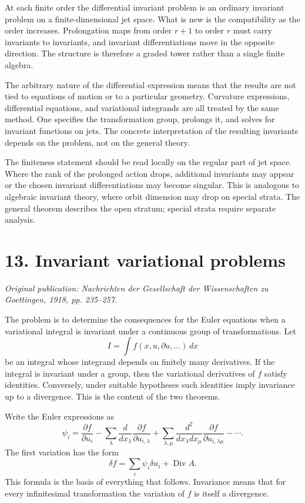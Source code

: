 \documentclass[12pt]{article}
\begin{document}
At each finite order the differential invariant problem is an ordinary invariant problem on a
finite-dimensional jet space. What is new is the compatibility as the order increases. Prolongation
maps from order \(r+1\) to order \(r\) must carry invariants to invariants, and invariant
differentiations move in the opposite direction. The structure is therefore a graded tower rather
than a single finite algebra.

The arbitrary nature of the differential expression means that the results are not tied to equations
of motion or to a particular geometry. Curvature expressions, differential equations, and
variational integrands are all treated by the same method. One specifies the transformation group,
prolongs it, and solves for invariant functions on jets. The concrete interpretation of the
resulting invariants depends on the problem, not on the general theory.

The finiteness statement should be read locally on the regular part of jet space. Where the rank of
the prolonged action drops, additional invariants may appear or the chosen invariant
differentiations may become singular. This is analogous to algebraic invariant theory, where orbit
dimension may drop on special strata. The general theorem describes the open stratum; special strata
require separate analysis.


\section{13. Invariant variational problems}

\textit{Original publication: Nachrichten der Gesellschaft der Wissenschaften zu Goettingen, 1918, pp. 235--257.}

The problem is to determine the consequences for the Euler equations when a variational integral is
invariant under a continuous group of transformations. Let \[   I=\int f(x,u,\partial u,\ldots)\,dx
\] be an integral whose integrand depends on finitely many derivatives. If the integral is invariant
under a group, then the variational derivatives of \(f\) satisfy identities. Conversely, under
suitable hypotheses such identities imply invariance up to a divergence. This is the content of the
two theorems.


Write the Euler expressions as \[   \psi_i=\frac{\partial f}{\partial u_i}   -\sum_\lambda
\frac{d}{dx_\lambda}\frac{\partial f}{\partial u_{i,\lambda}}
+\sum_{\lambda,\mu}\frac{d^2}{dx_\lambda dx_\mu}        \frac{\partial f}{\partial
u_{i,\lambda\mu}}-\cdots . \] The first variation has the form \[   \delta f=\sum_i \psi_i\delta
u_i+\operatorname{Div} A. \] This formula is the basis of everything that follows. Invariance means
that for every infinitesimal transformation the variation of \(f\) is itself a divergence.
\end{document}
